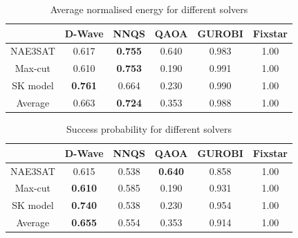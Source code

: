 \begin{table}[!htb]
    \centering
    \begin{tabular}{cccccc} \toprule
        ~ & D-Wave & NNQS & QAOA & GUROBI & Fixstar \\ \midrule
        NAE3SAT & 0.617 & \textbf{0.755} & 0.640 & 0.983 & 1.00 \\
        Max-cut & 0.610 & \textbf{0.753} & 0.190 & 0.991 & 1.00 \\
        SK model & \textbf{0.761} & 0.664 & 0.230 & 0.990 & 1.00 \\ \midrule
        Average & 0.663 & \textbf{0.724} & 0.353 & 0.988 & 1.00 \\ \bottomrule
    \end{tabular}
    \caption{Average normalised energy for different solvers}
    \label{results:allnormalizedenergy}
\end{table}

\begin{table}[!htb]
    \centering
    \begin{tabular}{cccccc} \toprule
        ~ & D-Wave & NNQS & QAOA & GUROBI & Fixstar \\ \midrule
        NAE3SAT & 0.615 & 0.538 & \textbf{0.640} & 0.858 & 1.00 \\
        Max-cut & \textbf{0.610} & 0.585 & 0.190 & 0.931 & 1.00 \\
        SK model & \textbf{0.740} & 0.538 & 0.230 & 0.954 & 1.00 \\ \midrule
        Average & \textbf{0.655} & 0.554 & 0.353 & 0.914 & 1.00 \\ \bottomrule
    \end{tabular}
\caption{Success probability for different solvers}
\label{results:allsuccess}
\end{table}

